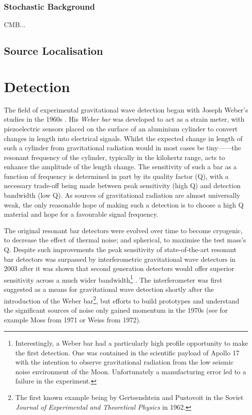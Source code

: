 \subsubsection{Stochastic Background}
CMB...


\subsection{Source Localisation}

\section{Detection}
The field of experimental gravitational wave detection began with Joseph Weber's studies in the 1960s \cite{Weber1960}. His \emph{Weber bar} was developed to act as a strain meter, with piezoelectric sensors placed on the surface of an aluminium cylinder to convert changes in length into electrical signals. Whilst the expected change in length of such a cylinder from gravitational radiation would in most cases be tiny------the resonant frequency of the cylinder, typically in the kilohertz range, acts to enhance the amplitude of the length change. The sensitivity of such a bar as a function of frequency is determined in part by its quality factor (Q), with a necessary trade-off being made between peak sensitivity (high Q) and detection bandwidth (low Q). As sources of gravitational radiation are almost universally weak, the only reasonable hope of making such a detection is to choose a high Q material and hope for a favourable signal frequency.

The original resonant bar detectors were evolved over time to become cryogenic, to decrease the effect of thermal noise; and spherical, to maximise the test mass's Q. Despite such improvements the peak sensitivity of state-of-the-art resonant bar detectors was surpassed by interferometric gravitational wave detectors in 2003 \cite{Pitkin2011} after it was shown that second generation detectors would offer superior sensitivity across a much wider bandwidth\footnote{Interestingly, a Weber bar had a particularly high profile opportunity to make the first detection. One was contained in the scientific payload of Apollo 17 with the intention to observe gravitational radiation from the low seismic noise environment of the Moon. Unfortunately a manufacturing error led to a failure in the experiment.} \cite{Harry2002a}. The interferometer was first suggested as a means for gravitational wave detection shortly after the introduction of the Weber bar\footnote{The first known example being by Gertsenshtein and Pustovoit in the Soviet \emph{Journal of Experimental and Theoretical Physics} in 1962.}, but efforts to build prototypes and understand the significant sources of noise only gained momentum in the 1970s (see for example Moss \etal \cite{Moss1971} from 1971 or Weiss \cite{Weiss1972} from 1972).

